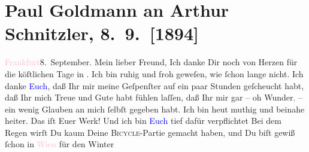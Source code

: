

               \section[Paul Goldmann an Arthur Schnitzler, 8. 9. {[}1894{]}]{ Paul Goldmann an Arthur Schnitzler, 8. 9. {[}1894{]}}\nopagebreak{}\rehead{ }\normalsize\beginnumbering{} \toendnotes[C]{\smallbreak\pagebreak[2]} 
\toendnotes[C]{\smallbreak}\pstart
           \raggedleft{}{\pb}\textcolor{pink}{Frankfurt}{}\ledrightnote{\textcolor{pink}{Frankfurt am Main}}{ }8. September.\pend
           \pstart\center{}Mein lieber Freund,\pend\pstart
           Ich danke Dir noch von Herzen für die köſtlichen Tage in \label{K_L02612-1v}\label{K_L02612-1h}. Ich bin
               ruhig und froh geweſen, wie ſchon lange nicht. Ich danke \textcolor{blue}{Euch}{}, daß Ihr mir meine
               Geſpenſter auf ein paar Stunden geſcheucht habt, daß Ihr mich Treue und Gute habt
               fühlen laſſen, {\pb}daß Ihr mir gar – oh
                  Wunder\textcolor{gray}{,} – ein wenig Glauben an mich ſelbſt gegeben habt. Ich
               bin heut muthig und beinahe heiter. Das iſt Euer Werk!
               Und ich bin \textcolor{blue}{Euch}{}
               tief dafür \strikeout{\textcolor{gray}{v}} verpflichtet{\dotsfive}\pend
           \pstart
           Bei dem Regen wirſt Du kaum Deine \textsc{Bicycle}-Partie gemacht
               haben, und Du biſt gewiß ſchon in \textcolor{pink}{Wien}{}\ledrightnote{\textcolor{pink}{Wien}} für den Winter
